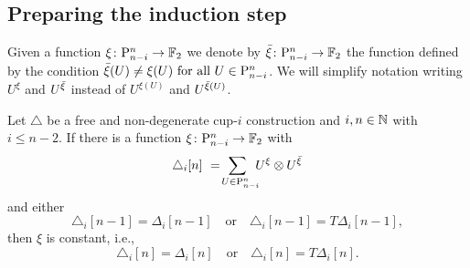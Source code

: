 \subsection{Preparing the induction step}

\begin{notation}
	Given a function $\xi \colon \mathrm{P}_{n-i}^n \to {\mathbb{F}_2}$ we denote by ${\bar{\xi}} \colon \mathrm{P}_{n-i}^n \to {\mathbb{F}_2}$ the function defined by the condition ${\bar{\xi}}(U) \neq \xi(U) \text{ for all } U \in \mathrm{P}_{n-i}^n$.
	We will simplify notation writing $U^\xi$ and $U^{{\bar{\xi}}}$ instead of $U^{\xi(U)}$ and $U^{{\bar{\xi}}(U)}$.
\end{notation}

\begin{lemma} \label{l:first nail}
	Let $\triangle$ be a free and non-degenerate cup-$i$ construction and $i,n \in \mathbb{N}$ with $i \leq n-2$.
	If there is a function $\xi \colon \mathrm{P}_{n-i}^n \to {\mathbb{F}_2}$ with
	\begin{equation} \label{e:assumed identity with xi and barxi}
	\triangle_i [n] \ = \!
	\sum_{U \in \mathrm{P}_{n-i}^n \kern-5pt} U^{\xi} \otimes U^{{\bar{\xi}}}
	\end{equation}
	and either
	\[
	\triangle_i [n-1] = \Delta_i [n-1]
	\quad \text{or} \quad
	\triangle_i [n-1] = T\Delta_i [n-1],
	\]
	then $\xi$ is constant, i.e.,
	\[
	\triangle_i [n] = \Delta_i [n]
	\quad \text{or} \quad
	\triangle_i [n] = T \Delta_i [n].
	\]
\end{lemma}

